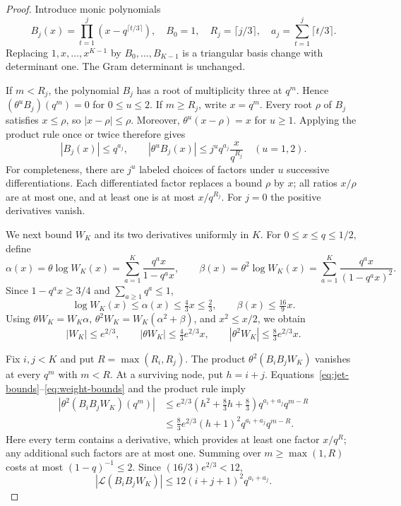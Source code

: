 \documentclass[11pt,letterpaper]{article}
\numberwithin{equation}{section}
\theoremstyle{remark}
\newcommand{\Lcal}{\mathcal L}
\begin{document}
\begin{proof}
Introduce monic polynomials
\begin{equation*}
 B_j(x)=\prod_{t=1}^j(x-q^{\lceil t/3\rceil}),\quad B_0=1,
 \quad R_j=\lceil j/3\rceil,\quad
 a_j=\sum_{t=1}^j\lceil t/3\rceil.
\end{equation*}
Replacing $1,x,\ldots,x^{K-1}$ by $B_0,\ldots,B_{K-1}$ is a triangular basis change with determinant one. The Gram determinant is unchanged.

If $m<R_j$, the polynomial $B_j$ has a root of multiplicity three at $q^m$. Hence $(\theta^uB_j)(q^m)=0$ for $0\le u\le2$. If $m\ge R_j$, write $x=q^m$. Every root $\rho$ of $B_j$ satisfies $x\le\rho$, so $|x-\rho|\le\rho$. Moreover, $\theta^u(x-\rho)=x$ for $u\ge1$. Applying the product rule once or twice therefore gives
\begin{equation}\label{eq:jet-bounds}
 |B_j(x)|\le q^{a_j},\qquad
 |\theta^uB_j(x)|\le j^uq^{a_j}\frac{x}{q^{R_j}}\quad(u=1,2).
\end{equation}
For completeness, there are $j^u$ labeled choices of factors under $u$ successive differentiations. Each differentiated factor replaces a bound $\rho$ by $x$; all ratios $x/\rho$ are at most one, and at least one is at most $x/q^{R_j}$. For $j=0$ the positive derivatives vanish.

We next bound $W_K$ and its two derivatives uniformly in $K$. For $0\le x\le q\le1/2$, define
\begin{equation*}
 \alpha(x)=\theta\log W_K(x)
   =\sum_{a=1}^K\frac{q^ax}{1-q^ax},\qquad
 \beta(x)=\theta^2\log W_K(x)
   =\sum_{a=1}^K\frac{q^ax}{(1-q^ax)^2}.
\end{equation*}
Since $1-q^ax\ge3/4$ and $\sum_{a\ge1}q^a\le1$,
\begin{equation*}
 \log W_K(x)\le\alpha(x)\le\tfrac43x\le\tfrac23,
 \qquad \beta(x)\le\tfrac{16}{9}x.
\end{equation*}
Using $\theta W_K=W_K\alpha$, $\theta^2W_K=W_K(\alpha^2+\beta)$, and $x^2\le x/2$, we obtain
\begin{equation}\label{eq:weight-bounds}
 |W_K|\le e^{2/3},\qquad
 |\theta W_K|\le\tfrac43e^{2/3}x,\qquad
 |\theta^2W_K|\le\tfrac83e^{2/3}x.
\end{equation}

Fix $i,j<K$ and put $R=\max(R_i,R_j)$. The product $\theta^2(B_iB_jW_K)$ vanishes at every $q^m$ with $m<R$. At a surviving node, put $h=i+j$. Equations~\eqref{eq:jet-bounds}--\eqref{eq:weight-bounds} and the product rule imply
\begin{align*}
 |\theta^2(B_iB_jW_K)(q^m)|
 &\le e^{2/3}\left(h^2+\tfrac83h+\tfrac83\right)
       q^{a_i+a_j}q^{m-R}\\
 &\le\tfrac83e^{2/3}(h+1)^2q^{a_i+a_j}q^{m-R}.
\end{align*}
Here every term contains a derivative, which provides at least one factor $x/q^R$; any additional such factors are at most one. Summing over $m\ge\max(1,R)$ costs at most $(1-q)^{-1}\le2$. Since $(16/3)e^{2/3}<12$,
\begin{equation}\label{eq:entry-bound}
 |\Lcal(B_iB_jW_K)|\le12(i+j+1)^2q^{a_i+a_j}.
\end{equation}


\end{proof}
\end{document}

